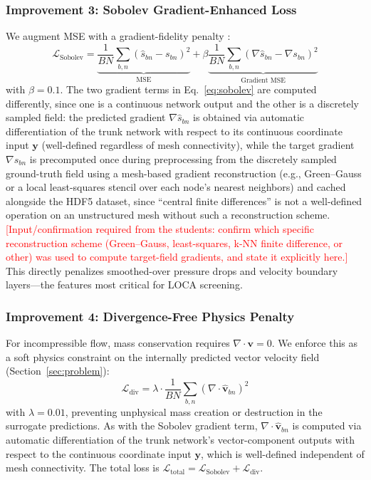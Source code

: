 \documentclass[journal]{IEEEtran}
\begin{document}
\subsubsection{Improvement 3: Sobolev Gradient-Enhanced Loss}
We augment MSE with a gradient-fidelity penalty \cite{son2021sobolev}:
\begin{equation}
\mathcal{L}_\text{Sobolev} = \underbrace{\frac{1}{BN}\sum_{b,n}(\hat{s}_{bn} - s_{bn})^2}_{\text{MSE}} + \beta \underbrace{\frac{1}{BN}\sum_{b,n}(\nabla\hat{s}_{bn} - \nabla s_{bn})^2}_{\text{Gradient MSE}}
\label{eq:sobolev}
\end{equation}
with $\beta = 0.1$. The two gradient terms in Eq.~\eqref{eq:sobolev} are computed differently, since one is a continuous network output and the other is a discretely sampled field: the predicted gradient $\nabla\hat{s}_{bn}$ is obtained via automatic differentiation of the trunk network with respect to its continuous coordinate input $\bm{y}$ (well-defined regardless of mesh connectivity), while the target gradient $\nabla s_{bn}$ is precomputed once during preprocessing from the discretely sampled ground-truth field using a mesh-based gradient reconstruction (e.g., Green--Gauss or a local least-squares stencil over each node's nearest neighbors) and cached alongside the HDF5 dataset, since ``central finite differences'' is not a well-defined operation on an unstructured mesh without such a reconstruction scheme. \textcolor{red}{[Input/confirmation required from the students: confirm which specific reconstruction scheme (Green--Gauss, least-squares, k-NN finite difference, or other) was used to compute target-field gradients, and state it explicitly here.]} This directly penalizes smoothed-over pressure drops and velocity boundary layers---the features most critical for LOCA screening.

\subsubsection{Improvement 4: Divergence-Free Physics Penalty}
For incompressible flow, mass conservation requires $\nabla \cdot \bm{v} = 0$. We enforce this as a soft physics constraint on the internally predicted vector velocity field (Section~\ref{sec:problem}):
\begin{equation}
\mathcal{L}_\text{div} = \lambda \cdot \frac{1}{BN}\sum_{b,n}\left(\nabla \cdot \hat{\bm{v}}_{bn}\right)^2
\label{eq:div}
\end{equation}
with $\lambda = 0.01$, preventing unphysical mass creation or destruction in the surrogate predictions. As with the Sobolev gradient term, $\nabla \cdot \hat{\bm{v}}_{bn}$ is computed via automatic differentiation of the trunk network's vector-component outputs with respect to the continuous coordinate input $\bm{y}$, which is well-defined independent of mesh connectivity. The total loss is $\mathcal{L}_\text{total} = \mathcal{L}_\text{Sobolev} + \mathcal{L}_\text{div}$.
\end{document}
